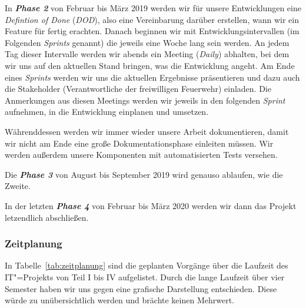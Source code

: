 In \textit{\textbf{Phase 2}} von Februar bis März 2019 werden wir für unsere Entwicklungen eine \textit{Defintion of Done} (\textit{DOD}), also eine Vereinbarung darüber erstellen, wann wir ein Feature für fertig erachten. Danach beginnen wir mit Entwicklungsintervallen (im Folgenden \textit{Sprints }genannt) die jeweils eine Woche lang sein werden. An jedem Tag dieser Intervalle werden wir abends ein Meeting (\textit{Daily}) abhalten, bei dem wir uns auf den aktuellen Stand bringen, was die Entwicklung angeht. Am Ende eines \textit{Sprints} werden wir uns die aktuellen Ergebnisse präsentieren und dazu auch die Stakeholder (Verantwortliche der freiwilligen Feuerwehr) einladen. Die Anmerkungen aus diesen Meetings werden wir jeweils in den folgenden \textit{Sprint} aufnehmen, in die Entwicklung einplanen und umsetzen. 

Währenddessen werden wir immer wieder unsere Arbeit dokumentieren, damit wir nicht am Ende eine große Dokumentationsphase einleiten müssen. Wir werden außerdem unsere Komponenten mit automatisierten Tests versehen.

Die \textit{\textbf{Phase 3}} von August bis September 2019 wird genauso ablaufen, wie die Zweite.

In der letzten \textit{\textbf{Phase 4}} von Februar bis März 2020 werden wir dann das Projekt letzendlich abschließen.  

\subsubsection{Zeitplanung}

In Tabelle~\ref{tab:zeitplanung} sind die geplanten Vorgänge über die Laufzeit des IT"=Projekts von Teil I bis IV aufgelistet. Durch die lange Laufzeit über vier Semester haben wir uns gegen eine grafische Darstellung entschieden. Diese würde zu unübersichtlich werden und brächte keinen Mehrwert.


